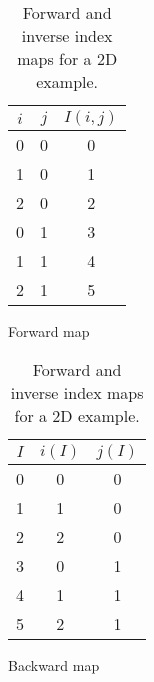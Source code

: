     \begin{table}[ht!]
        \centering
        \begin{subfigure}{0.45\textwidth}
            \centering
        \begin{tabular}{c c | c}
            \toprule $i$ & $j$ & $I(i,j)$ \\ \midrule
            0 & 0 & 0 \\
            1 & 0 & 1 \\
            2 & 0 & 2 \\
            0 & 1 & 3 \\
            1 & 1 & 4 \\
            2 & 1 & 5 \\ \bottomrule
        \end{tabular}
        \caption{Forward map}
        \end{subfigure}
        \begin{subfigure}{0.45\textwidth}
            \centering
        \begin{tabular}{c | c c}
            \toprule $I$ & $i(I)$ & $j(I)$ \\ \midrule
            0 & 0 & 0 \\
            1 & 1 & 0 \\
            2 & 2 & 0 \\
            3 & 0 & 1 \\
            4 & 1 & 1 \\
            5 & 2 & 1 \\ \bottomrule
        \end{tabular}
        \caption{Backward map}
        \end{subfigure}
        \caption{Forward and inverse index maps for a 2D example.}
    \end{table}

